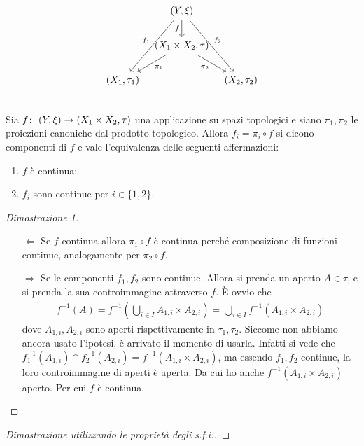 \begin{theorem}
	\begin{equation}
		\begin{tikzcd}[column sep=0.7em]
		& (Y, \xi) \arrow[swap]{d}{f} \arrow[swap]{ddl}{f_1} \arrow{ddr}{f_2} & \\
		& (X_1 \times X_2, \tau) \arrow[swap]{dr}{\pi_2} \arrow{dl}{\pi_1} & \\
		(X_1, \tau_1) &  & (X_2, \tau_2)\\
		\end{tikzcd}
	\end{equation}
	Sia $f \colon\ (Y, \xi) \rightarrow (X_1 \times X_2, \tau)$ una applicazione su spazi topologici e siano $\pi_1,\pi_2$ le proiezioni canoniche dal prodotto topologico. Allora $f_i = \pi_i \circ f$ si dicono componenti di $f$ e vale l'equivalenza delle seguenti affermazioni:
	\begin{enumerate}
		\item $f$ è continua;
		\item $f_i$ sono continue per $i \in \{1,2\}$.
	\end{enumerate}
\end{theorem}
\begin{proof}[Dimostrazione 1]
	\begin{enumerate}
		\item[$\Leftarrow$] Se $f$ continua allora $\pi_1 \circ f$ è continua perché composizione di funzioni continue, analogamente per $\pi_2 \circ f$.
		\item[$\Rightarrow$] Se le componenti $f_1, f_2$ sono continue. Allora si prenda un aperto $A \in \tau$, e si prenda la sua controimmagine attraverso $f$. È ovvio che 
		\begin{equation}
		\begin{aligned}
			f^{-1}(A) = f^{-1}(\bigcup_{i \in I} A_{1,i} \times A_{2,i}) = \bigcup_{i \in I} f^{-1}(A_{1,i} \times A_{2,i})
		\end{aligned}
		\end{equation}
		dove $A_{1,i}, A_{2,i}$ sono aperti rispettivamente in $\tau_1, \tau_2$. Siccome non abbiamo ancora usato l'ipotesi, è arrivato il momento di usarla. Infatti si vede che $f^{-1}_1(A_{1,i}) \cap f^{-1}_2(A_{2,i}) = f^{-1}(A_{1,i} \times A_{2,i})$, ma essendo $f_1, f_2$ continue, la loro controimmagine di aperti è aperta. Da cui ho anche $f^{-1}(A_{1,i} \times A_{2,i})$ aperto. Per cui $f$ è continua. 
	\end{enumerate}
\end{proof}
\begin{proof}[Dimostrazione utilizzando le proprietà degli s.f.i.]
\end{proof}

